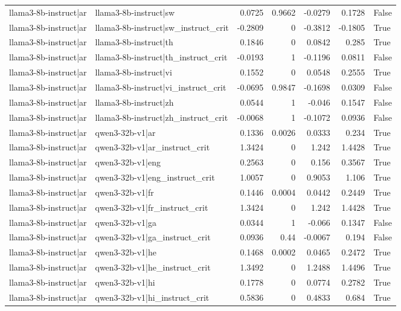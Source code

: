 \begin{table}
\begin{tabular}{l l r r r r l}
llama3-8b-instruct|ar & llama3-8b-instruct|sw & 0.0725 & 0.9662 & -0.0279 & 0.1728 & False \\
llama3-8b-instruct|ar & llama3-8b-instruct|sw_instruct_crit & -0.2809 & 0 & -0.3812 & -0.1805 & True \\
llama3-8b-instruct|ar & llama3-8b-instruct|th & 0.1846 & 0 & 0.0842 & 0.285 & True \\
llama3-8b-instruct|ar & llama3-8b-instruct|th_instruct_crit & -0.0193 & 1 & -0.1196 & 0.0811 & False \\
llama3-8b-instruct|ar & llama3-8b-instruct|vi & 0.1552 & 0 & 0.0548 & 0.2555 & True \\
llama3-8b-instruct|ar & llama3-8b-instruct|vi_instruct_crit & -0.0695 & 0.9847 & -0.1698 & 0.0309 & False \\
llama3-8b-instruct|ar & llama3-8b-instruct|zh & 0.0544 & 1 & -0.046 & 0.1547 & False \\
llama3-8b-instruct|ar & llama3-8b-instruct|zh_instruct_crit & -0.0068 & 1 & -0.1072 & 0.0936 & False \\
llama3-8b-instruct|ar & qwen3-32b-v1|ar & 0.1336 & 0.0026 & 0.0333 & 0.234 & True \\
llama3-8b-instruct|ar & qwen3-32b-v1|ar_instruct_crit & 1.3424 & 0 & 1.242 & 1.4428 & True \\
llama3-8b-instruct|ar & qwen3-32b-v1|eng & 0.2563 & 0 & 0.156 & 0.3567 & True \\
llama3-8b-instruct|ar & qwen3-32b-v1|eng_instruct_crit & 1.0057 & 0 & 0.9053 & 1.106 & True \\
llama3-8b-instruct|ar & qwen3-32b-v1|fr & 0.1446 & 0.0004 & 0.0442 & 0.2449 & True \\
llama3-8b-instruct|ar & qwen3-32b-v1|fr_instruct_crit & 1.3424 & 0 & 1.242 & 1.4428 & True \\
llama3-8b-instruct|ar & qwen3-32b-v1|ga & 0.0344 & 1 & -0.066 & 0.1347 & False \\
llama3-8b-instruct|ar & qwen3-32b-v1|ga_instruct_crit & 0.0936 & 0.44 & -0.0067 & 0.194 & False \\
llama3-8b-instruct|ar & qwen3-32b-v1|he & 0.1468 & 0.0002 & 0.0465 & 0.2472 & True \\
llama3-8b-instruct|ar & qwen3-32b-v1|he_instruct_crit & 1.3492 & 0 & 1.2488 & 1.4496 & True \\
llama3-8b-instruct|ar & qwen3-32b-v1|hi & 0.1778 & 0 & 0.0774 & 0.2782 & True \\
llama3-8b-instruct|ar & qwen3-32b-v1|hi_instruct_crit & 0.5836 & 0 & 0.4833 & 0.684 & True \\

\end{tabular}
\end{table}
